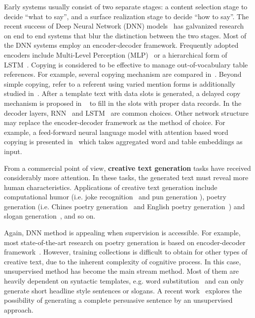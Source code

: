 \documentclass[sigconf]{acmart}
\begin{document}
Early systems usually consist of two separate stages: a content selection stage to decide ``what to say'', and a  surface realization stage to decide ``how to say''.  The recent success of Deep Neural Network (DNN) models~\cite{Sutskever2011Generating} has galvanized research on end to end systems that blur the distinction between the two stages. Most of the DNN systems employ an encoder-decoder framework. Frequently adopted encoders include Multi-Level Perception (MLP)~\cite{dong2017learning,Wiseman2017Challenges,Bao2019Text} or a hierarchical form of LSTM~\cite{Yang2017Reference}. Copying is considered to be effective to manage out-of-vocabulary table references. For example,  
several copying mechanism are compared in~\cite{Bao2019Text, Wiseman2017Challenges}. Beyond simple copying, refer to a referent using varied mention forms is additionally studied in~\cite{Yang2017Reference}. After a template text with data slots is generated,  a delayed copy mechanism is proposed in ~\cite{Li2018Point} to fill in the slots with proper data records.   In the decoder layers, RNN~\cite{Wiseman2017Challenges} and LSTM~\cite{Yang2017Reference} are common choices. 
Other network structure may replace the encoder-decoder framework as the method of choice. For example, a feed-forward neural language model with attention based word copying is presented in~\cite{Lebret2016Neural} which takes aggregated word and table embeddings as input. 

From a commercial point of view, \textbf{creative text generation} tasks have received considerably more attention. In these tasks, the generated text must reveal more human characteristics. 
Applications of creative text generation include computational humor (i.e. joke recognition~\cite{kiddon2011double} and pun generation \cite{valitutti2013let}), poetry generation (i.e. Chines poetry generation~\cite{wang2016chinese,Zhang2014Chinese} and English poetry generation~\cite{Ghazvininejad2016Generating,Colton2012Full})
and slogan generation~\cite{tomavsic2014implementation}, and so on.

Again, DNN method is appealing when supervision is accessible. For example, most state-of-the-art research on poetry generation is based on encoder-decoder framework~\cite{Ghazvininejad2016Generating,Colton2012Full,wang2016chinese,Zhang2014Chinese}.
However, training collections is difficult to obtain for other types of creative text, due to the inherent complexity of cognitive process. 
In this case, unsupervised method has become the main stream method.
Most of them are heavily dependent on syntactic templates, e.g. word substitution~\cite{valitutti2013let,ozbal2013brainsup} and can only generate short headline style sentences or slogans. 
A recent work~\cite{munigala2018persuaide} explores the possibility of generating a complete persuasive sentence by an unsupervised approach.
\end{document}
